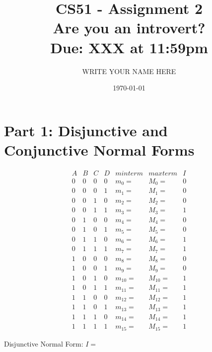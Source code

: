 \documentclass[11pt]{article}
\title{CS51 - Assignment 2\\Are you an introvert?\\{\normalsize Due: XXX at 11:59pm}}
\author{WRITE YOUR NAME HERE}
\date{\today}
\begin{document}
\maketitle

\section{Part 1: Disjunctive and Conjunctive Normal Forms}


\begin{displaymath}
\begin{array}{cccc|c|c|c}
A & B & C & D  & minterm & maxterm & I\\
\hline

0 & 0 & 0 & 0 & m_0 =  & M_0 =  & 0 \\
0 & 0 & 0 & 1 & m_1 =  & M_1 =  & 0 \\
0 & 0 & 1 & 0 & m_2 =  & M_2 =  & 0 \\
0 & 0 & 1 & 1 & m_3 =  & M_3 =  & 1 \\
0 & 1 & 0 & 0 & m_4 =  & M_4 =  & 0 \\
0 & 1 & 0 & 1 & m_5 =  & M_5 =  & 0 \\
0 & 1 & 1 & 0 & m_6 =  & M_6 =  & 1 \\
0 & 1 & 1 & 1 & m_7 =  & M_7 =  & 1 \\
1 & 0 & 0 & 0 & m_8 =  & M_8 =  & 0 \\
1 & 0 & 0 & 1 & m_9 =  & M_9 =  & 0 \\
1 & 0 & 1 & 0 & m_{10} =  & M_{10} =   & 1 \\
1 & 0 & 1 & 1 & m_{11} =  & M_{11} =  & 1 \\
1 & 1 & 0 & 0 & m_{12} =  & M_{12} =   & 1 \\
1 & 1 & 0 & 1 & m_{13} =  & M_{13} =  & 1 \\
1 & 1 & 1 & 0 & m_{14} =  & M_{14} = & 1 \\
1 & 1 & 1 & 1 & m_{15} = & M_{15} =   & 1
\end{array}
\end{displaymath}


Disjunctive Normal Form: $I = $
\end{document}
